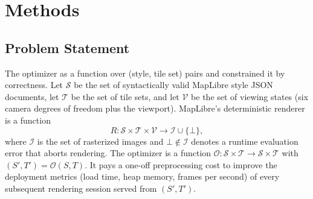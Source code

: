 
\section{Methods}\label{sec:methods}

\subsection{Problem Statement}\label{sec:methods:problem}

The optimizer as a function over (style, tile set) pairs and constrained it by correctness.
Let $\mathcal{S}$ be the set of syntactically valid MapLibre style \ac{JSON} documents, let $\mathcal{T}$ be the set of tile sets, and let $\mathcal{V}$ be the set of viewing states (six camera degrees of freedom plus the viewport).
MapLibre's deterministic renderer is a function
\begin{equation}\label{eq:render_function}
    R : \mathcal{S} \times \mathcal{T} \times \mathcal{V} \to \mathcal{I} \cup \{\bot\},
\end{equation}
where $\mathcal{I}$ is the set of rasterized images and $\bot \notin \mathcal{I}$ denotes a runtime evaluation error that aborts rendering.
The optimizer is a function $\mathcal{O}: \mathcal{S} \times \mathcal{T} \to \mathcal{S} \times \mathcal{T}$ with $(S', T') = \mathcal{O}(S, T)$.
It pays a one-off preprocessing cost to improve the deployment metrics (load time, heap memory, frames per second) of every subsequent rendering session served from $(S', T')$.

